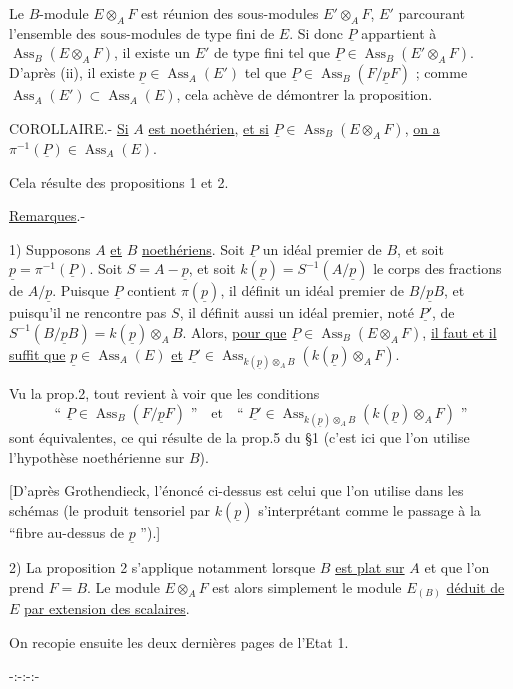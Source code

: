 
Le $B$-module $E\otimes_A F$ est réunion des sous-modules $E'\otimes_A F$, $E'$ parcourant
l'ensemble des sous-modules de type fini de $E$. Si donc $\underline P$ appartient à
$\operatorname{Ass}_B(E\otimes_A F)$, il existe un $E'$ de type fini tel que $\underline P\in\operatorname{Ass}_B(E'\otimes_A F)$. D'après
(ii), il existe $\underline p\in\operatorname{Ass}_A(E')$ tel que $\underline P\in\operatorname{Ass}_B(F/\underline pF)$ ; comme
$\operatorname{Ass}_A(E')\subset\operatorname{Ass}_A(E)$, cela achève de démontrer la proposition.

COROLLAIRE.- \uline{Si} $A$ \uline{est noethérien}, \uline{et si} $\underline P\in\operatorname{Ass}_B(E\otimes_A F)$, \uline{on a}
$\pi^{-1}(\underline P)\in\operatorname{Ass}_A(E)$.

Cela résulte des propositions 1 et 2.

\uline{Remarques}.-

1) Supposons $A$ \uline{et} $B$ \uline{noethériens}. Soit $\underline P$ un idéal premier de $B$, et soit
$\underline p=\pi^{-1}(\underline P)$. Soit $S=A-\underline p$, et soit $k(\underline p)=S^{-1}(A/\underline p)$ le corps des fractions
de $A/\underline p$. Puisque $\underline P$ contient $\pi(\underline p)$, il définit un idéal premier de $B/\underline pB$, et
puisqu'il ne rencontre pas $S$, il définit aussi un idéal premier, noté $\underline{P'}$,
de $S^{-1}(B/\underline pB)=k(\underline p)\otimes_A B$. Alors, \uline{pour que} $\underline P\in\operatorname{Ass}_B(E\otimes_A F)$, \uline{il faut et il}
\uline{suffit que} $\underline p\in\operatorname{Ass}_A(E)$ \uline{et} $\underline{P'}\in\operatorname{Ass}_{k(\underline p)\otimes_A B}(k(\underline p)\otimes_A F)$.

Vu la prop.2, tout revient à voir que les conditions
\[
\text{`` }\underline P\in\operatorname{Ass}_B(F/\underline pF)\text{ ''}\quad\text{et}\quad
\text{`` }\underline{P'}\in\operatorname{Ass}_{k(\underline p)\otimes_A B}(k(\underline p)\otimes_A F)\text{ ''}
\]
sont équivalentes, ce qui résulte de la prop.5 du §1 (c'est ici que l'on
utilise l'hypothèse noethérienne sur $B$).

[D'après Grothendieck, l'énoncé ci-dessus est celui que l'on utilise dans
les schémas (le produit tensoriel par $k(\underline p)$ s'interprétant comme le passage
à la ``fibre au-dessus de $\underline p$ '').]

2) La proposition 2 s'applique notamment lorsque $B$ \uline{est plat sur} $A$ et que
l'on prend $F=B$. Le module $E\otimes_A F$ est alors simplement le module $E_{(B)}$
\uline{déduit de} $E$ \uline{par extension des scalaires}.

On recopie ensuite les deux dernières pages de l'Etat 1.

\begin{center}-:-:-:-\end{center}
